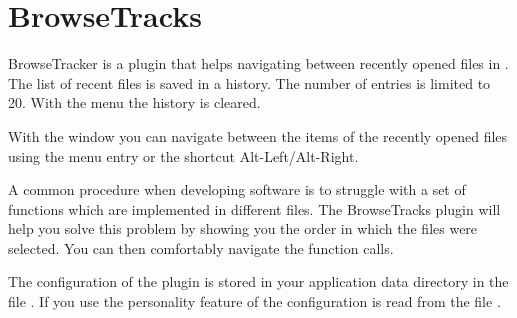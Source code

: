 \section{BrowseTracks}\label{sec:browsetracks}

BrowseTracker is a plugin that helps navigating between recently opened files in \codeblocks. The list of recent files is saved in a history. The number of entries is limited to 20. With the menu  the history is cleared.

With the window  you can navigate between the items of the recently opened files using the menu entry  or the shortcut Alt-Left/Alt-Right.

A common procedure when developing software is to struggle with a set of functions which are implemented in different files. The BrowseTracks plugin will help you solve this problem by showing you the order in which the files were selected. You can then comfortably navigate the function calls.

The configuration of the plugin is stored in your application data directory in the file . If you use the personality feature of \codeblocks the configuration is read from the file .

